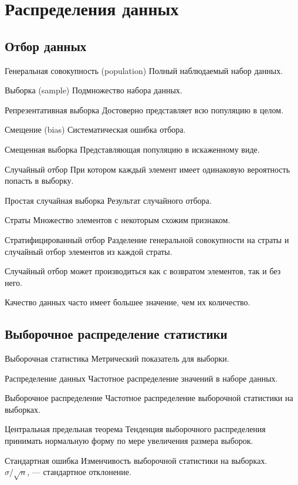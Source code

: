 \section{Распределения данных}

\subsection{Отбор данных}
\begin{terms}
    \item[Генеральная совокупность (population)] Полный наблюдаемый набор данных.
    \item[Выборка (sample)] Подмножество набора данных.
    \item[Репрезентативная выборка] Достоверно представляет всю популяцию в целом.
    \item[Смещение (bias)] Систематическая ошибка отбора.
    \item[Смещенная выборка] Представляющая популяцию в искаженному виде.
    \item[Случайный отбор] При котором каждый элемент имеет одинаковую вероятность попасть в выборку.
    \item[Простая случайная выборка] Результат случайного отбора.
    \item[Страты] Множество элементов с некоторым схожим признаком.
    \item[Стратифицированный отбор]
    Разделение генеральной совокупности на страты и случайный отбор элементов из каждой страты.
\end{terms}
Случайный отбор может производиться как с возвратом элементов, так и без него.
\par Качество данных часто имеет большее значение, чем их количество.

\subsection{Выборочное распределение статистики}
\begin{terms}
    \item[Выборочная статистика] Метрический показатель для выборки.
    \item[Распределение данных] Частотное распределение значений в наборе данных.
    \item[Выборочное распределение] Частотное распределение выборочной статистики на выборках.
    \item[Центральная предельная теорема] Тенденция выборочного распределения принимать нормальную форму
    по мере увеличения размера выборок.
    \item[Стандартная ошибка] Изменчивость выборочной статистики на выборках.\\
    $\sigma / \sqrt{n}$, \quad \sigma --- стандартное отклонение.
\end{terms}

